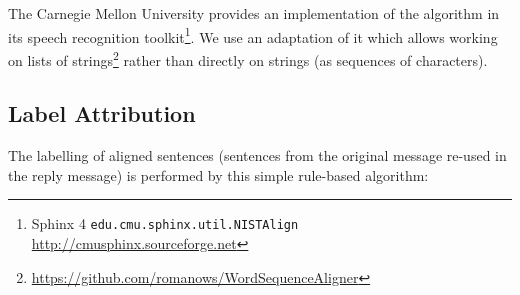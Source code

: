 The Carnegie Mellon University provides an implementation of the algorithm in its speech recognition toolkit\footnote{Sphinx 4 \texttt{edu.cmu.sphinx.util.NISTAlign} \url{http://cmusphinx.sourceforge.net}}.
%
We use an adaptation of it which allows working on lists of strings\footnote{\url{https://github.com/romanows/WordSequenceAligner}} rather than directly on strings (as sequences of characters).

\subsection{Label Attribution}

The labelling of aligned sentences (sentences from the original message re-used in the reply message) is performed by this simple rule-based algorithm:


